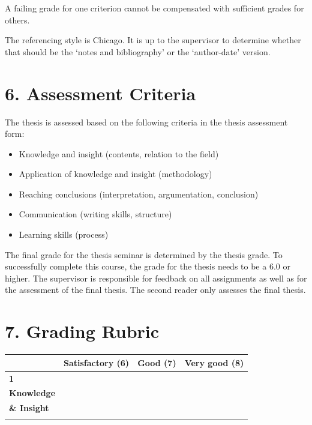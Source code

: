 \documentclass[11pt,a4paper]{article}
\begin{document}
A failing grade for one criterion cannot be compensated with sufficient grades for others.

The referencing style is Chicago. It is up to the supervisor to determine whether that should be the `notes and bibliography' or the `author-date' version.

\section{6. Assessment Criteria}

The thesis is assessed based on the following criteria in the thesis assessment form:

\begin{itemize}
    \item Knowledge and insight (contents, relation to the field)
    \item Application of knowledge and insight (methodology)
    \item Reaching conclusions (interpretation, argumentation, conclusion)
    \item Communication (writing skills, structure)
    \item Learning skills (process)
\end{itemize}

The final grade for the thesis seminar is determined by the thesis grade. To successfully complete this course, the grade for the thesis needs to be a 6.0 or higher. The supervisor is responsible for feedback on all assignments as well as for the assessment of the final thesis. The second reader only assesses the final thesis.

\section{7. Grading Rubric}

\begin{center}
\small
\begin{tabularx}{\textwidth}{lXXX}
\toprule
 & \textbf{Satisfactory (6)} & \textbf{Good (7)} & \textbf{Very good (8)} \\
\midrule
\textbf{1} & & & \\
\textbf{Knowledge} & & & \\
\textbf{\& Insight} & & & \\
\midrule
\multicolumn{4}{p{\textwidth}}{} \\
\bottomrule
\end{tabularx}
\end{center}
\end{document}
